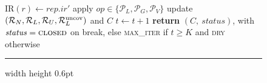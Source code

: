 \begin{figure}[tb]
\begin{algorithmic}[1]
        \State $\mathrm{IR}(r)\gets \mathit{rep}.ir'$ 
      \EndIf
    \EndFor
  \Else
    \State apply $\mathit{op}\in\{\mathcal{P}_L,\mathcal{P}_G,\mathcal{P}_V\}$
  \EndIf
  \State update $(\mathcal{R}_N,\mathcal{R}_L,\mathcal{R}_U,\mathcal{R}_L^{\mathrm{uncov}})$ and $C$
  \State $t\gets t+1$
\State \textbf{return} $(C,\ \mathit{status})$, with $\mathit{status}=\textsc{closed}$
  on break, else \textsc{max\_iter} if $t\ge K$ and \textsc{dry} otherwise
\end{algorithmic}
\vspace{1pt}
\hrule width \linewidth height 0.6pt\relax
\end{figure}
